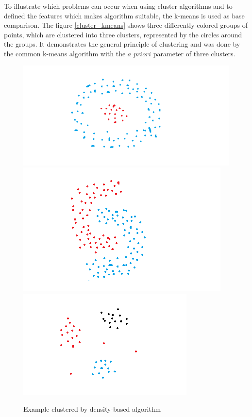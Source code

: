\documentclass[a4paper,headsepline,footsepline,fontsize=11pt,BCOR=12mm,DIV=12]{report}
\begin{document}
To illustrate which problems can occur when using cluster algorithms and to defined the features which makes algorithm suitable, the k-means is used as base comparison. The figure \ref{cluster_kmeans} shows three differently colored groups of points, which are clustered into three clusters, represented by the circles around the groups. It demonstrates the general principle of clustering and was done by the common k-means algorithm with the $a$ $priori$ parameter of three clusters. 

\begin{figure}[h]
	\centering
	\includegraphics[scale=0.4]{./assets/cluster_1.png}
	\includegraphics[scale=0.4]{./assets/cluster_2.png}
	\includegraphics[scale=0.4]{./assets/cluster_3.png}
	\caption{Example clustered by density-based algorithm \cite{Yildirim2020}}
	\label{cluster_dbscan}
\end{figure}
\end{document}
